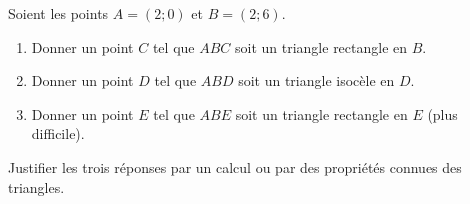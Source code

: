 
\begin{exercice}\label{exosmath-0125}

    Soient les points \( A=(2;0)\) et \( B=(2;6)\).
    \begin{enumerate}
        \item
            Donner un point \( C\) tel que \( ABC\) soit un triangle rectangle en \( B\).
        \item
            Donner un point \( D\) tel que \( ABD\) soit un triangle isocèle en \( D\).
        \item
            Donner un point \( E\) tel que \( ABE\) soit un triangle rectangle en \( E\) (plus difficile).
    \end{enumerate}
    Justifier les trois réponses par un calcul ou par des propriétés connues des triangles.

\end{exercice}
